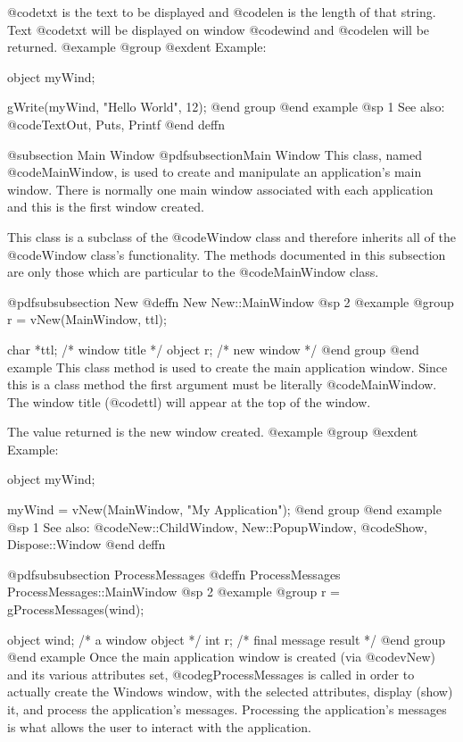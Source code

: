 @code{txt} is the text to be displayed and @code{len} is the length of that
string.  Text @code{txt} will be displayed on window @code{wind} and
@code{len} will be returned.
@example
@group
@exdent Example:

object  myWind;

gWrite(myWind, "Hello World\n", 12);
@end group
@end example
@sp 1
See also:  @code{TextOut, Puts, Printf}
@end deffn











@subsection Main Window
@pdfsubsection{Main Window}
This class, named @code{MainWindow}, is used to create and manipulate an
application's main window.  There is normally one main window associated
with each application and this is the first window created.

This class is a subclass of the @code{Window} class and therefore
inherits all of the @code{Window} class's functionality.  The methods
documented in this subsection are only those which are particular
to the @code{MainWindow} class.



@pdfsubsubsection {New}
@deffn {New} New::MainWindow
@sp 2
@example
@group
r = vNew(MainWindow, ttl);

char    *ttl;   /*  window title  */
object  r;      /*  new window    */
@end group
@end example
This class method is used to create the main application window.
Since this is a class method the first argument must be literally
@code{MainWindow}.  The window title (@code{ttl}) will appear at
the top of the window.

The value returned is the new window created.
@example
@group
@exdent Example:

object  myWind;

myWind = vNew(MainWindow, "My Application");
@end group
@end example
@sp 1
See also:  @code{New::ChildWindow, New::PopupWindow,}
      @code{Show, Dispose::Window}
@end deffn







@pdfsubsubsection {ProcessMessages}
@deffn {ProcessMessages} ProcessMessages::MainWindow
@sp 2
@example
@group
r = gProcessMessages(wind);

object  wind;   /*  a window object       */
int     r;      /*  final message result  */
@end group
@end example
Once the main application window is created (via @code{vNew}) and
its various attributes set, @code{gProcessMessages} is called in order
to actually create the Windows window, with the selected attributes,
display (show) it, and process the application's messages.  Processing
the application's messages is what allows the user to interact with the
application.

